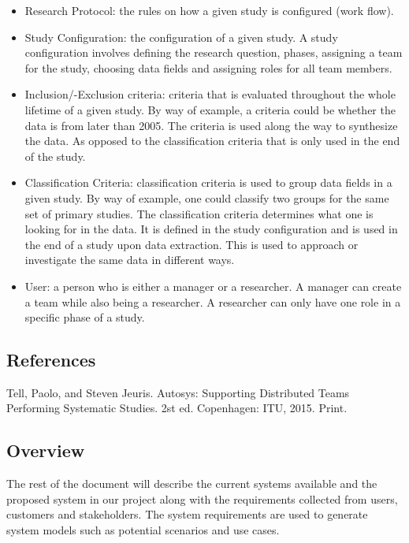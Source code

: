 \begin{itemize}
	  \item Research Protocol: the rules on how a given study is configured (work flow).
	  \item Study Configuration: the configuration of a given study. A study configuration involves defining the research question, phases, assigning a team for the study, choosing data fields and assigning roles for all team members. 
	  \item Inclusion/-Exclusion criteria: criteria that is evaluated throughout the whole lifetime of a given study. By way of example, a criteria could be whether the data is from later than 2005. The criteria is used along the way to synthesize the data. As opposed to the classification criteria that is only used in the end of the study. 
	  \item Classification Criteria: classification criteria is used to group data fields in a given study. By way of example, one could classify two groups for the same set of primary studies. The classification criteria determines what one is looking for in the data. It is defined in the study configuration and is used in the end of a study upon data extraction. This is used to approach or investigate the same data in different ways.
	  \item User: a person who is either a manager or a researcher. A manager can create a team while also being a researcher. A researcher can only have one role in a specific phase of a study. 
	\end{itemize}
	
\subsection{References}
Tell, Paolo, and Steven Jeuris. Autosys: Supporting Distributed Teams Performing Systematic Studies. 2st ed. Copenhagen: ITU, 2015. Print.

\subsection{Overview}
The rest of the document will describe the current systems available and the proposed system in our project along with the requirements collected from users, customers and stakeholders. The system requirements are used to generate system models such as potential scenarios and use cases. 
